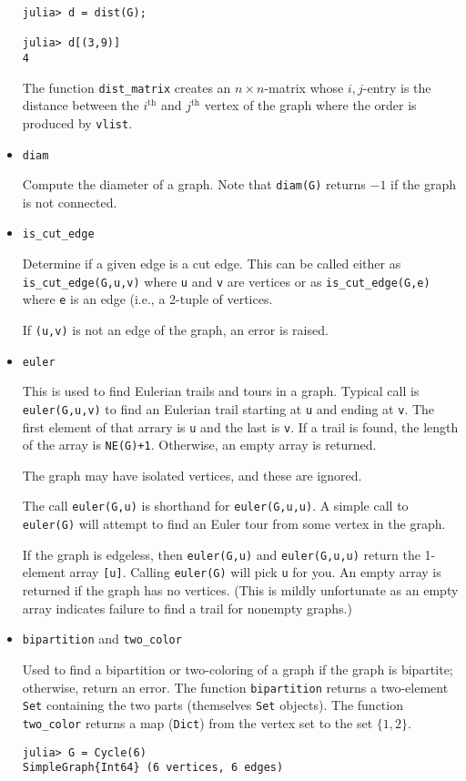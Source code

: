 \documentclass[oneside]{amsart}
\begin{document}
\begin{itemize}
{\begin{verbatim}
julia> d = dist(G);

julia> d[(3,9)]
4
\end{verbatim}
  }

  The function \verb|dist_matrix| creates an $n\times n$-matrix whose
  $i,j$-entry is the distance between the $i^{\text{th}}$ and
  $j^{\text{th}}$ vertex of the graph where the order is produced by
  \verb|vlist|.


\item \verb|diam|

  Compute the diameter of a graph. Note that \verb|diam(G)| returns
  $-1$ if the graph is not connected.


\item \verb|is_cut_edge|

  Determine if a given edge is a cut edge. This can be called either
  as \verb|is_cut_edge(G,u,v)| where \verb|u| and \verb|v| are
  vertices or as \verb|is_cut_edge(G,e)| where \verb|e| is an edge
  (i.e., a 2-tuple of vertices.

  If \verb|(u,v)| is not an edge of the graph, an error is raised.


\item \verb|euler|

  This is used to find Eulerian trails and tours in a graph. Typical
  call is \verb|euler(G,u,v)| to find an Eulerian trail starting at
  \verb|u| and ending at \verb|v|.  The first element of that arrary
  is \verb|u| and the last is \verb|v|. If a trail is found, the
  length of the array is \verb|NE(G)+1|. Otherwise, an empty array is
  returned.

  The graph may have isolated vertices, and these are ignored.

  The call \verb|euler(G,u)| is shorthand for \verb|euler(G,u,u)|. A
  simple call to \verb|euler(G)| will attempt to find an Euler tour
  from some vertex in the graph.

  If the graph is edgeless, then \verb|euler(G,u)| and
  \verb|euler(G,u,u)| return the 1-element array \verb|[u]|. Calling
  \verb|euler(G)| will pick \verb|u| for you.  An empty array is
  returned if the graph has no vertices. (This is mildly unfortunate
  as an empty array indicates failure to find a trail for nonempty
  graphs.)

\item \verb|bipartition| and \verb|two_color|

  Used to find a bipartition or two-coloring of a graph if the graph
  is bipartite; otherwise, return an error. The function
  \verb|bipartition| returns a two-element \verb|Set| containing the
  two parts (themselves \verb|Set| objects). The function
  \verb|two_color| returns a map (\verb|Dict|) from the vertex set to
  the set $\{1,2\}$.
  {\small
\begin{verbatim}
julia> G = Cycle(6)
SimpleGraph{Int64} (6 vertices, 6 edges)


\end{verbatim}}
\end{itemize}
\end{document}
